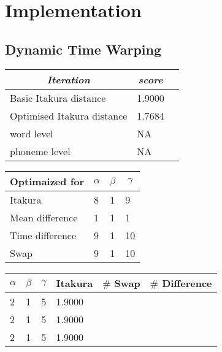 \chapter{Implementation} %
\label{cha:implementation}

\section{Dynamic Time Warping} %
\label{sec:dynamic_time_warping}

\begin{table}[htbp]
	\begin{center}
		\begin{tabular}{lll}
			\toprule
			\multicolumn{1}{c}{\emph{Iteration}} & \multicolumn{1}{c}{\emph{score}} \\
			\midrule
			Basic Itakura distance & 1.9000 \\
			Optimised Itakura distance & 1.7684 \\
			word level & NA \\
			phoneme level & NA \\
			\bottomrule			
		\end{tabular}		
	\end{center}
\label{tab:dtw_accuracy}	
\end{table}

\begin{table}[htbp]
	\begin{center}
		\begin{tabular}{llll}
			\toprule
			\multicolumn{1}{c}{Optimaized for} & \multicolumn{1}{c}{$\alpha$} & \multicolumn{1}{c}{$\beta$} & \multicolumn{1}{c}{$\gamma$} \\
			\midrule
			Itakura & 8 & 1 & 9 \\
			Mean difference & 1 & 1 & 1 \\
			Time difference & 9 & 1 & 10 \\
			Swap & 9 & 1 & 10 \\			
			\bottomrule			
		\end{tabular}		
	\end{center}
\label{tab:local_constraints}	
\end{table}

\begin{table}[htbp]
	\begin{center}
		\begin{tabular}{llllll}
			\toprule
			\multicolumn{1}{c}{$\alpha$} & \multicolumn{1}{c}{$\beta$} & \multicolumn{1}{c}{$\gamma$} & \multicolumn{1}{c}{Itakura}  & \multicolumn{1}{c}{$\#$ Swap} & \multicolumn{1}{c}{$\#$ Difference}\\
			\midrule
			2 & 1 & 5 & 1.9000 & & \\
			2 & 1 & 5 & 1.9000 & & \\
			2 & 1 & 5 & 1.9000 & & \\			
			\bottomrule			
		\end{tabular}		
	\end{center}
\label{tab:local_constraints_II}	
\end{table}

